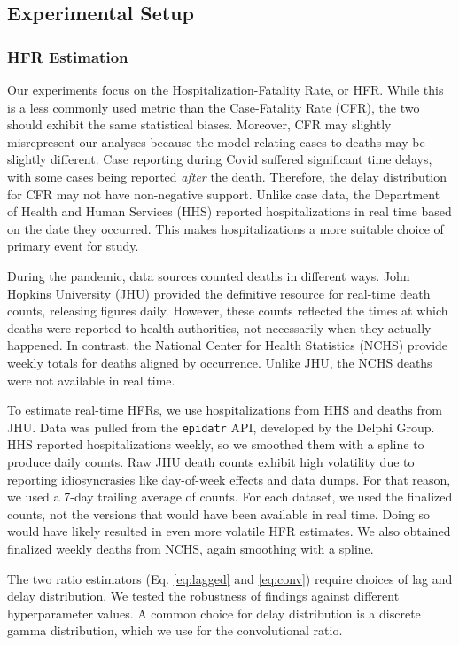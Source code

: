 \documentclass{article}
\begin{document}
\subsection{Experimental Setup}
\subsubsection{HFR Estimation}
Our experiments focus on the Hospitalization-Fatality Rate, or HFR. While this is a less commonly used metric than the Case-Fatality Rate (CFR), the two should exhibit the same statistical biases. Moreover, CFR may slightly misrepresent our analyses because the model relating cases to deaths may be slightly different. Case reporting during Covid suffered significant time delays, with some cases being reported \textit{after} the death. Therefore, the delay distribution for CFR may not have non-negative support. Unlike case data, the Department of Health and Human Services (HHS) reported hospitalizations in real time based on the date they occurred. This makes hospitalizations a more suitable choice of primary event for study. 

During the pandemic, data sources counted deaths in different ways. John Hopkins University (JHU) provided the definitive resource for real-time death counts, releasing figures daily. However, these counts reflected the times at which deaths were reported to health authorities, not necessarily when they actually happened. In contrast, the National Center for Health Statistics (NCHS) provide weekly totals for deaths aligned by occurrence. Unlike JHU, the NCHS deaths were not available in real time.

To estimate real-time HFRs, we use hospitalizations from HHS and deaths from JHU. Data was pulled from the \texttt{epidatr} API, developed by the Delphi Group. HHS reported hospitalizations weekly, so we smoothed them with a spline to produce daily counts. Raw JHU death counts exhibit high volatility due to reporting idiosyncrasies like day-of-week effects and data dumps. For that reason, we used a 7-day trailing average of counts. For each dataset, we used the finalized counts, not the versions that would have been available in real time. Doing so would have likely resulted in even more volatile HFR estimates. We also obtained finalized weekly deaths from NCHS, again smoothing with a spline.

The two ratio estimators (Eq. \ref{eq:lagged} and \ref{eq:conv}) require choices of lag and delay distribution. We tested the robustness of findings against different hyperparameter values. A common choice for delay distribution is a discrete gamma distribution, which we use for the convolutional ratio.
\end{document}
